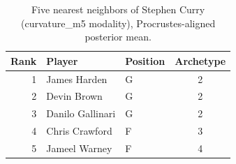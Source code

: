 \begin{table}[htbp]
  \centering\small
  \begin{tabular}{rllc}
    \toprule
    Rank & Player & Position & Archetype \\
    \midrule
    1 & James Harden & G & 2 \\
    2 & Devin Brown & G & 2 \\
    3 & Danilo Gallinari & G & 2 \\
    4 & Chris Crawford & F & 3 \\
    5 & Jameel Warney & F & 4 \\
    \bottomrule
  \end{tabular}
  \caption{Five nearest neighbors of Stephen Curry (curvature_m5 modality), Procrustes-aligned posterior mean.}
  \label{tab:Stephen_Curry_neighbors_curvature_m5}
\end{table}

